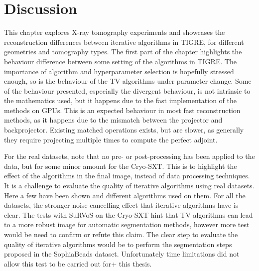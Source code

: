 \section{Discussion}
This chapter explores X-ray tomography experiments and showcases the reconstruction differences between iterative algorithms in TIGRE, for different geometries and tomography types. The first part of the chapter highlights the behaviour difference between some setting of the algorithms in TIGRE. The importance of algorithm and hyperparameter selection is hopefully stressed enough, so is the behaviour of the TV algorithms under parameter change. Some of the behaviour presented, especially the divergent behaviour, is not intrinsic to the mathematics used, but it happens due to the fast implementation of the methods on GPUs. This is an expected behaviour in most fast reconstruction methods, as it happens due to the mismatch between the projector and backprojector. Existing matched operations exists, but are slower, as generally they require projecting multiple times to compute the perfect adjoint. 

For the real datasets, note that no pre- or post-processing has been applied to the data, but for some minor amount for the Cryo-SXT. This is to highlight the effect of the algorithms in the final image, instead of data processing techniques. It is a challenge to evaluate the quality of iterative algorithms using real datasets. Here a few have been shown and different algorithms used on them. For all the datasets, the stronger noise cancelling effect that iterative algorithms have is clear. The tests with SuRVoS on the Cryo-SXT hint that TV algorithms can lead to a more robust image for automatic segmentation methods, however more test would be need to confirm or refute this claim. The clear step to evaluate the quality of iterative algorithms would be to perform the segmentation steps proposed in the SophiaBeads dataset. Unfortunately time limitations did not allow this test to be carried out for+ this thesis. 

